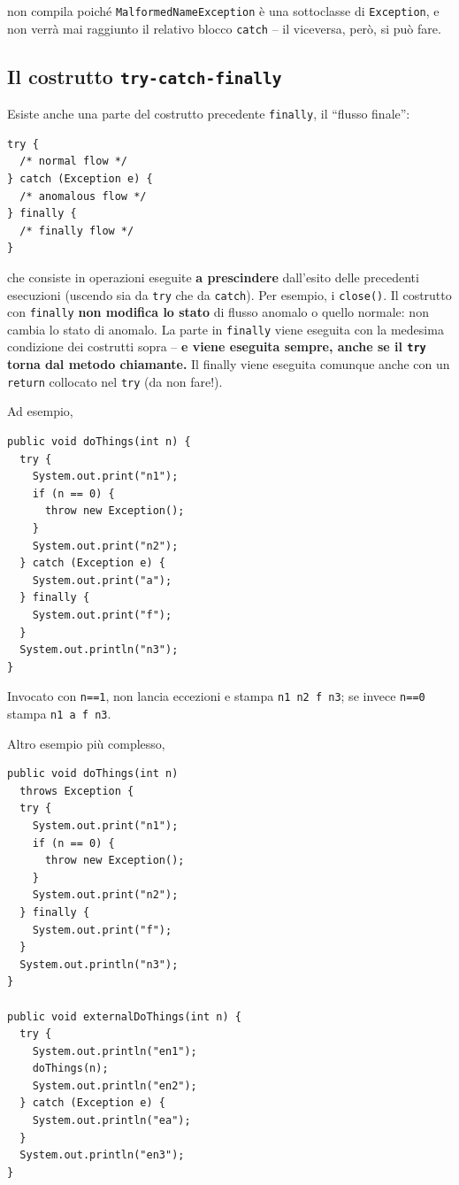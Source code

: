 \documentclass[\fontsizeclass,twocolumn]{\classname}
\theoremstyle{definition}
\theoremstyle{definition}
\begin{document}
non compila poiché \texttt{MalformedNameException} è una sottoclasse di
\texttt{Exception}, e non verrà mai raggiunto il relativo blocco \texttt{catch}
-- il viceversa, però, si può fare.

\subsection{Il costrutto \texttt{try\--catch-finally}}

Esiste anche una parte del costrutto precedente \texttt{finally}, il ``flusso
finale'':

\begin{lstlisting}
try {
  /* normal flow */
} catch (Exception e) {
  /* anomalous flow */
} finally {
  /* finally flow */
}
\end{lstlisting}

che consiste in operazioni eseguite \textbf{a prescindere} dall'esito delle
precedenti esecuzioni (uscendo sia da \texttt{try} che da \texttt{catch}). Per
esempio, i \texttt{close()}. Il costrutto con \texttt{finally} \textbf{non
modifica lo stato} di flusso anomalo o quello normale: non cambia lo stato di
anomalo. La parte in \texttt{finally} viene eseguita con la medesima condizione
dei costrutti sopra -- \textbf{e viene eseguita sempre, anche se il
\texttt{try} torna dal metodo chiamante.} Il finally viene eseguita comunque
anche con un \texttt{return} collocato nel \texttt{try} (da non fare!).

Ad esempio,

\begin{lstlisting}
public void doThings(int n) {
  try {
    System.out.print("n1");
    if (n == 0) {
      throw new Exception();
    }
    System.out.print("n2");
  } catch (Exception e) {
    System.out.print("a");
  } finally {
    System.out.print("f");
  }
  System.out.println("n3");
}
\end{lstlisting}

Invocato con \texttt{n==1}, non lancia eccezioni e stampa \texttt{n1 n2 f n3};
se invece \texttt{n==0} stampa \texttt{n1 a f n3}.

Altro esempio più complesso,

\begin{lstlisting}
public void doThings(int n)
  throws Exception {
  try {
    System.out.print("n1");
    if (n == 0) {
      throw new Exception();
    }
    System.out.print("n2");
  } finally {
    System.out.print("f");
  }
  System.out.println("n3");
}

public void externalDoThings(int n) {
  try {
    System.out.println("en1");
    doThings(n);
    System.out.println("en2");
  } catch (Exception e) {
    System.out.println("ea");
  }
  System.out.println("en3");
}
\end{lstlisting}
\end{document}
